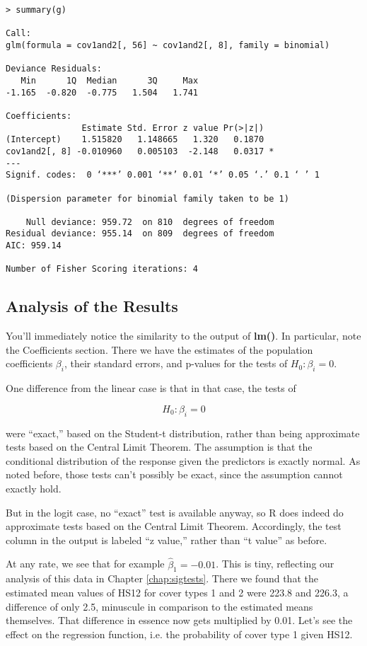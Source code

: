 \begin{Verbatim}[fontsize=\relsize{-2}]
> summary(g)

Call:
glm(formula = cov1and2[, 56] ~ cov1and2[, 8], family = binomial)

Deviance Residuals:
   Min      1Q  Median      3Q     Max
-1.165  -0.820  -0.775   1.504   1.741

Coefficients:
               Estimate Std. Error z value Pr(>|z|)
(Intercept)    1.515820   1.148665   1.320   0.1870
cov1and2[, 8] -0.010960   0.005103  -2.148   0.0317 *
---
Signif. codes:  0 ‘***’ 0.001 ‘**’ 0.01 ‘*’ 0.05 ‘.’ 0.1 ‘ ’ 1

(Dispersion parameter for binomial family taken to be 1)

    Null deviance: 959.72  on 810  degrees of freedom
Residual deviance: 955.14  on 809  degrees of freedom
AIC: 959.14

Number of Fisher Scoring iterations: 4
\end{Verbatim}

\subsection{Analysis of the Results}

You'll immediately notice the similarity to the output of {\bf lm()}.
In particular, note the Coefficients section.  There we have the
estimates of the population coefficients $\beta_i$, their standard
errors, and p-values for the tests of $H_0: \beta_i = 0$.

One difference from the linear case is that in that case, the tests of 

\begin{equation}
 H_0:  \beta_i = 0
\end{equation}

were ``exact,'' based on the Student-t distribution, rather than being
approximate tests based on the Central Limit Theorem.  The assumption is
that the conditional distribution of the response given the predictors
is exactly normal.  As noted before, those tests can't possibly be
exact, since the assumption cannot exactly hold.

But in the logit case, no ``exact'' test is available anyway, so R does
indeed do approximate tests based on the Central Limit Theorem.
Accordingly, the test column in the output is labeled ``z value,''
rather than ``t value'' as before.

At any rate, we see that for example $\widehat{\beta}_1 = -0.01$.  This
is tiny, reflecting our analysis of this data in Chapter
\ref{chap:sigtests}.  There we found that the estimated mean values of
HS12 for cover types 1 and 2 were 223.8 and 226.3, a difference of only
2.5, minuscule in comparison to the estimated means themselves.  That
difference in essence now gets multiplied by 0.01.  Let's see the effect
on the regression function, i.e. the probability of cover type 1 given
HS12.

